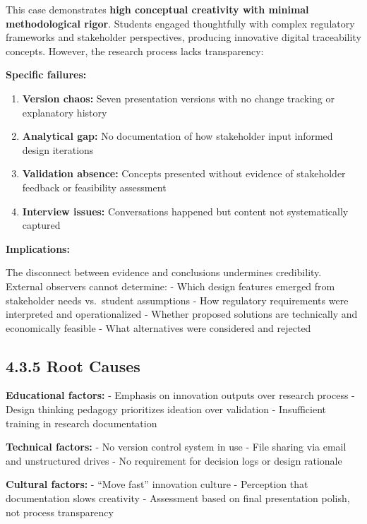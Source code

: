 \documentclass[
  oneside,
  open=any]{scrbook}
\providecommand{\tightlist}{%
  \setlength{\itemsep}{0pt}\setlength{\parskip}{0pt}}\usepackage{longtable,booktabs,array}
\begin{document}
This case demonstrates \textbf{high conceptual creativity with minimal
methodological rigor}. Students engaged thoughtfully with complex
regulatory frameworks and stakeholder perspectives, producing innovative
digital traceability concepts. However, the research process lacks
transparency:

\textbf{Specific failures:}

\begin{enumerate}
\def\labelenumi{\arabic{enumi}.}
\tightlist
\item
  \textbf{Version chaos:} Seven presentation versions with no change
  tracking or explanatory history
\item
  \textbf{Analytical gap:} No documentation of how stakeholder input
  informed design iterations
\item
  \textbf{Validation absence:} Concepts presented without evidence of
  stakeholder feedback or feasibility assessment
\item
  \textbf{Interview issues:} Conversations happened but content not
  systematically captured
\end{enumerate}

\textbf{Implications:}

The disconnect between evidence and conclusions undermines credibility.
External observers cannot determine: - Which design features emerged
from stakeholder needs vs.~student assumptions - How regulatory
requirements were interpreted and operationalized - Whether proposed
solutions are technically and economically feasible - What alternatives
were considered and rejected

\subsection{4.3.5 Root Causes}\label{root-causes-1}

\textbf{Educational factors:} - Emphasis on innovation outputs over
research process - Design thinking pedagogy prioritizes ideation over
validation - Insufficient training in research documentation

\textbf{Technical factors:} - No version control system in use - File
sharing via email and unstructured drives - No requirement for decision
logs or design rationale

\textbf{Cultural factors:} - ``Move fast'' innovation culture -
Perception that documentation slows creativity - Assessment based on
final presentation polish, not process transparency
\end{document}

